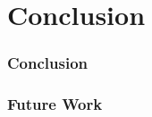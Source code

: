 \section{Conclusion}

\begin{frame}
	\frametitle{Conclusion}
\end{frame}

\begin{frame}
	\frametitle{Future Work}
\end{frame}

